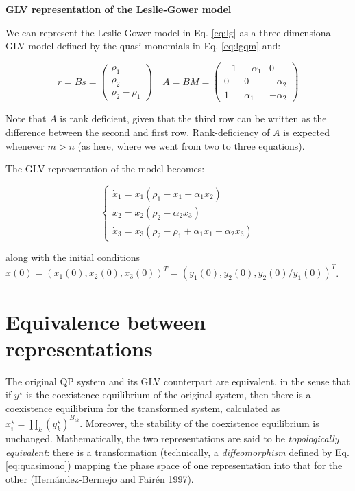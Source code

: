 \documentclass{article}
\begin{document}
\begin{cb}
\textbf{GLV representation of the Leslie-Gower model}

We can represent the Leslie-Gower model in Eq. \ref{eq:lg} as a three-dimensional GLV model defined by the quasi-monomials in Eq. \ref{eq:lgqm} and:

\begin{equation}
r = B s = \begin{pmatrix}
\rho_1\\
\rho_2\\
\rho_2 - \rho_1
\end{pmatrix}
\quad
A = B M = \begin{pmatrix}
-1 & -\alpha_1 & 0\\
0 & 0 & -\alpha_2\\
1 & \alpha_1 & -\alpha_2
\end{pmatrix}
\end{equation}

Note that $A$ is rank deficient, given that the third row can be written as the difference between the second and first row. Rank-deficiency of $A$ is expected whenever $m > n$ (as here, where we went from two to three equations).

The GLV representation of the model becomes:

\begin{equation}
\label{eq:lgglv}
\begin{cases}
\dot{x}_1 = x_1 (\rho_1 - x_1 - \alpha_1 x_2)\\
\dot{x}_2 = x_2 (\rho_2 - \alpha_2 x_3)\\
\dot{x}_3 = x_3 (\rho_2 - \rho_1 + \alpha_1 x_1 - \alpha_2 x_3)
\end{cases}
\end{equation}

along with the initial conditions $x(0) = (x_1(0), x_2(0), x_3(0))^T = (y_1(0), y_2(0), y_2(0) / y_1(0))^T$.

\end{cb}

\hypertarget{equivalence-between-representations}{%
\section{Equivalence between
representations}\label{equivalence-between-representations}}

The original QP system and its GLV counterpart are equivalent, in the
sense that if \(y^\star\) is the coexistence equilibrium of the original
system, then there is a coexistence equilibrium for the transformed
system, calculated as \(x_i^\star = \prod_{k} (y_k^\star)^{B_{ik}}\).
Moreover, the stability of the coexistence equilibrium is unchanged.
Mathematically, the two representations are said to be
\emph{topologically equivalent}: there is a transformation (technically,
a \emph{diffeomorphism} defined by Eq. \ref{eq:quasimono}) mapping the
phase space of one representation into that for the other
(Hernández-Bermejo and Fairén 1997).
\end{document}
